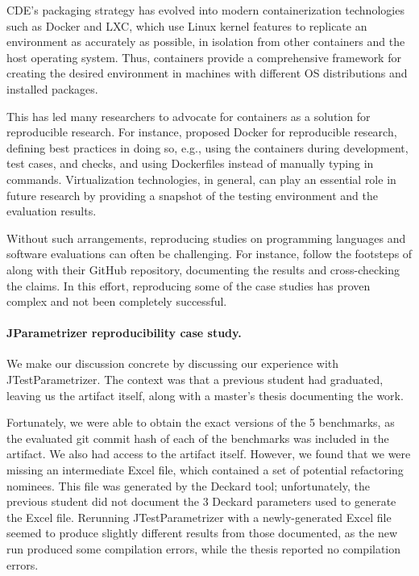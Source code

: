 CDE's packaging strategy has evolved into modern containerization technologies such as Docker and LXC, which use Linux kernel features to replicate an environment as accurately as possible, in isolation from other containers and the host operating system. Thus, containers provide a comprehensive framework for creating the desired environment in machines with different OS distributions and installed packages. 

This has led many researchers to advocate for containers as a solution for reproducible research. For instance,  proposed Docker for reproducible research, defining best practices in doing so, e.g., using the containers during development, test cases, and checks, and using Dockerfiles instead of manually typing in commands. Virtualization technologies, in general, can play an essential role in future research by providing a snapshot of the testing environment and the evaluation results.

Without such arrangements, reproducing studies on programming languages and software evaluations can often be challenging. For instance,  follow the footsteps of  along with their GitHub repository, documenting the results and cross-checking the claims. In this effort, reproducing some of the case studies has proven complex and not been completely successful.

\paragraph{JParametrizer reproducibility case study.}
We make our discussion concrete by discussing our experience with JTestParametrizer. The context was that a previous student had graduated, leaving us the artifact itself, along with a master's thesis documenting the work. 

Fortunately, we were able to obtain the exact versions of the 5 benchmarks, as the evaluated git commit hash of each of the benchmarks was included in the artifact. We also had access to the artifact itself. However, we found that we were missing an intermediate Excel file, which contained a set of potential refactoring nominees. This file was generated by the Deckard tool; unfortunately, the previous student did not document the 3 Deckard parameters used to generate the Excel file. Rerunning JTestParametrizer with a newly-generated Excel file seemed to produce slightly different results from those documented, as the new run produced some compilation errors, while the thesis reported no compilation errors.


